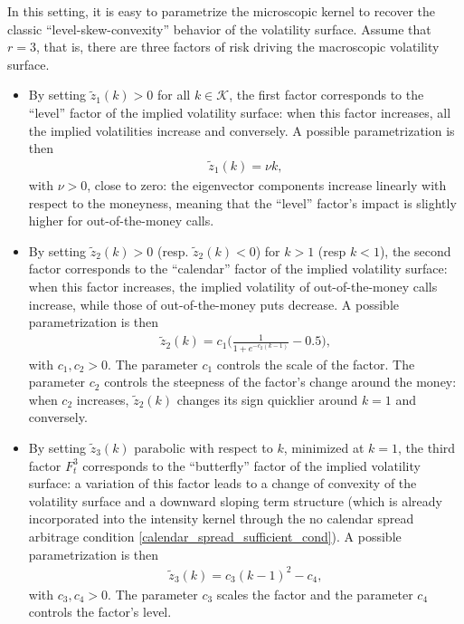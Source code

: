 \documentclass[12pt]{article}
\begin{document}
\medskip
In this setting, it is easy to parametrize the microscopic kernel to recover the classic ``level-skew-convexity'' behavior of the volatility surface. Assume that $r=3$, that is, there are three factors of risk driving the macroscopic volatility surface.
\begin{itemize}
    \item By setting $\tilde{z}_1(k) > 0$ for all $k\in \mathcal{K}$, the first factor corresponds to the ``level'' factor of the implied volatility surface: when this factor increases, all the implied volatilities increase and conversely. A possible parametrization is then
\begin{align*}
    \tilde{z}_1(k) = \nu k,
\end{align*}
with $\nu>0$, close to zero: the eigenvector components increase linearly with respect to the moneyness, meaning that the ``level'' factor's impact is slightly higher for out-of-the-money calls.   
    \item By setting $\tilde{z}_2(k) >0$ (resp. $\tilde{z}_2(k) <0$) for $k>1$ (resp $k<1$), the second factor corresponds to the ``calendar'' factor of the implied volatility surface: when this factor increases, the implied volatility of out-of-the-money calls increase, while those of out-of-the-money puts decrease. A possible parametrization is then
\begin{align*}
 \tilde{z}_2(k)=c_1\bigg(\frac{1}{1+e^{-c_2(k-1)}}-0.5\bigg),   
\end{align*}    
with $c_1,c_2 >0$. The parameter $c_1$ controls the scale of the factor. The parameter $c_2$ controls the steepness of the factor's change around the money: when $c_2$ increases, $\tilde{z}_2(k)$ changes its sign quicklier around $k=1$ and conversely.    
    \item By setting $\tilde{z}_3(k)$ parabolic with respect to $k$, minimized at $k=1$, the third factor $F^3_t$ corresponds to the ``butterfly'' factor of the implied volatility surface: a variation of this factor leads to a change of convexity of the volatility surface and a downward sloping term structure (which is already incorporated into the intensity kernel through the no calendar spread arbitrage condition \eqref{calendar_spread_sufficient_cond}). A possible parametrization is then
\begin{align*}
    \tilde{z}_3(k)=c_3 (k-1)^2 - c_4, 
\end{align*}
with $c_3,c_4>0$. The parameter $c_3$ scales  the factor and the parameter $c_4$ controls the factor's level. 
\end{itemize}
\end{document}
